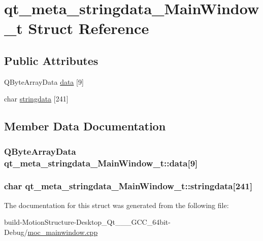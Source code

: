 \hypertarget{structqt__meta__stringdata___main_window__t}{\section{qt\-\_\-meta\-\_\-stringdata\-\_\-\-Main\-Window\-\_\-t Struct Reference}
\label{structqt__meta__stringdata___main_window__t}
}
\subsection*{Public Attributes}
\begin{DoxyCompactItemize}
\item 
Q\-Byte\-Array\-Data \hyperlink{structqt__meta__stringdata___main_window__t_a0211d0ef37920e3f737c66077647770e}{data} \mbox{[}9\mbox{]}
\item 
char \hyperlink{structqt__meta__stringdata___main_window__t_a51869b53c27424bcc9452d3680552f5d}{stringdata} \mbox{[}241\mbox{]}
\end{DoxyCompactItemize}


\subsection{Member Data Documentation}
\hypertarget{structqt__meta__stringdata___main_window__t_a0211d0ef37920e3f737c66077647770e}{
\subsubsection[{data}]{\setlength{\rightskip}{0pt plus 5cm}Q\-Byte\-Array\-Data qt\-\_\-meta\-\_\-stringdata\-\_\-\-Main\-Window\-\_\-t\-::data\mbox{[}9\mbox{]}}}\label{structqt__meta__stringdata___main_window__t_a0211d0ef37920e3f737c66077647770e}
\hypertarget{structqt__meta__stringdata___main_window__t_a51869b53c27424bcc9452d3680552f5d}{
\subsubsection[{stringdata}]{\setlength{\rightskip}{0pt plus 5cm}char qt\-\_\-meta\-\_\-stringdata\-\_\-\-Main\-Window\-\_\-t\-::stringdata\mbox{[}241\mbox{]}}}\label{structqt__meta__stringdata___main_window__t_a51869b53c27424bcc9452d3680552f5d}


The documentation for this struct was generated from the following file\-:\begin{DoxyCompactItemize}
\item 
build-\/\-Motion\-Structure-\/\-Desktop\-\_\-\-Qt\-\_\-\_\-\_\-\-G\-C\-C\-\_\-64bit-\/\-Debug/\hyperlink{moc__mainwindow_8cpp}{moc\-\_\-mainwindow.\-cpp}\end{DoxyCompactItemize}
